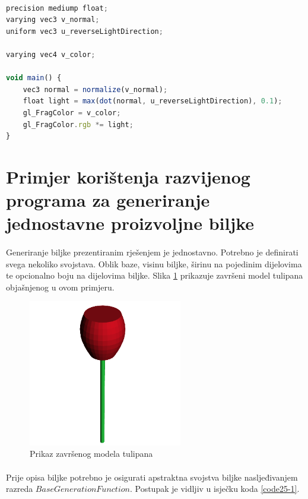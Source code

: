\documentclass[times, utf8, diplomski]{fer}
\begin{document}
\paragraph{}
\begin{lstlisting}[language=Javascript,caption=Program za sjenčanje slikovnih elemenata,label=code24-5]
precision mediump float;
varying vec3 v_normal;
uniform vec3 u_reverseLightDirection;

varying vec4 v_color;

void main() {
    vec3 normal = normalize(v_normal);
    float light = max(dot(normal, u_reverseLightDirection), 0.1);
    gl_FragColor = v_color;
    gl_FragColor.rgb *= light;
}
\end{lstlisting}


\section{Primjer korištenja razvijenog programa za generiranje jednostavne proizvoljne biljke} \label{usage_tutorial}
\paragraph{}
Generiranje biljke prezentiranim rješenjem je jednostavno. Potrebno je definirati svega 
nekoliko svojstava. Oblik baze, visinu biljke, širinu na pojedinim dijelovima te opcionalno 
boju na dijelovima biljke. Slika \ref{fig:25-1} prikazuje završeni model tulipana 
objašnjenog u ovom primjeru.

\begin{figure}[h]
	\centering
	\includegraphics[width=0.6\textwidth]{img/25-1}
	\caption{Prikaz završenog modela tulipana}
	\label{fig:25-1}
\end{figure}

\paragraph{}
Prije opisa biljke potrebno je osigurati apstraktna svojstva biljke nasljeđivanjem razreda
$BaseGenerationFunction$. Postupak je vidljiv u isječku koda \ref{code25-1}.
\end{document}
